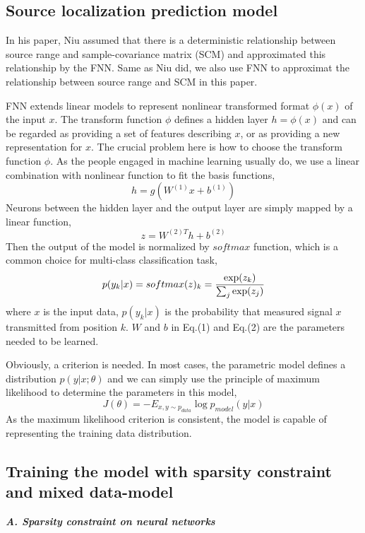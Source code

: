 \subsection{Source localization prediction model}
In his paper\cite{niu2017source}, Niu assumed that there is a deterministic relationship between source range and sample-covariance matrix (SCM) and approximated this relationship by the FNN. Same as Niu did, we also use FNN to approximat the relationship between
source range and SCM in this paper.

FNN extends linear models to represent nonlinear transformed format $\phi(x)$ of the input $x$. The transform function $\phi$ defines a hidden layer $h=\phi(x)$ and can be regarded as providing a set of features describing $x$, or as providing a new representation for $x$. The crucial problem here is how to choose the transform function $\phi$. As the people engaged in machine learning usually do, we use a linear combination with nonlinear function to fit the basis functions,
\begin{equation}
h = g(W^{(1)}x + b^{(1)})
\end{equation}
Neurons between the hidden layer and the output layer are simply mapped by a linear function,
\begin{equation}
z = {W^{(2)T}}h + {b^{(2)}}
\end{equation}
Then the output of the model is normalized by $ softmax $ function, which is a common choice for multi-class classification task\cite{bishop2006pattern},
\begin{equation}
p({y_k}|x) = softmax {(z)_k} = {{\exp ({z_k})} \over {\sum\nolimits_j {\exp ({z_j})} }}
\end{equation}
where $x$ is the input data, $p({y_k}|x)$ is the probability that measured signal $x$ transmitted from position $k$. $W$ and $b$ in Eq.(1) and Eq.(2) are the parameters needed to be learned.

Obviously, a criterion is needed. In most cases, the parametric model defines a distribution $p(y|x;\theta)$ and we can simply use the principle of maximum likelihood to determine the parameters in this model,
\begin{equation}
J(\theta ) =  - {E_{x,y \sim {p_{data}}}}\log {p_{model}}(y|x)
\end{equation}
As the maximum likelihood criterion is consistent, the model is capable of representing the training data distribution.

\subsection{Training the model with sparsity constraint and mixed data-model}
\emph{\textbf{A. Sparsity constraint on neural networks}}

